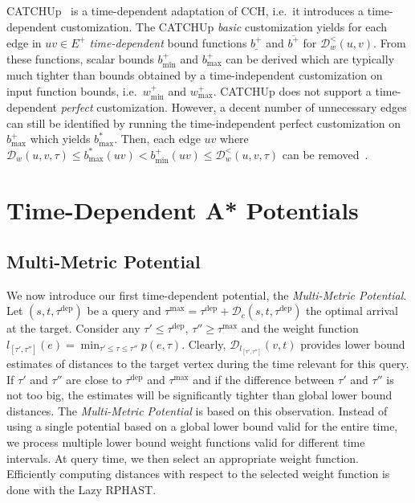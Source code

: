 \documentclass[a4paper,UKenglish,cleveref, autoref, thm-restate,anonymous]{lipics-v2021}
\newcommand*{\pred}{p}
\newcommand*{\dist}{\mathcal{D}}
\newcommand*{\tdep}{\tau^{\operatorname{dep}}}
\newcommand*{\tmax}{\tau^{\max}}
\begin{document}
CATCHUp~\cite{swz-sfert-21} is a time-dependent adaptation of CCH, i.e.\ it introduces a time-dependent customization.
The CATCHUp \emph{basic} customization yields for each edge in $uv \in E^+$ \emph{time-dependent} bound functions $\underline{b^+}$ and $\overline{b^+}$ for $\dist^<_w(u,v)$.
From these functions, scalar bounds $b^+_{\min}$ and $b^+_{\max}$ can be derived which are typically much tighter than bounds obtained by a time-independent customization on input function bounds, i.e.\ $w^+_{\min}$ and $w^+_{\max}$.
CATCHUp does not support a time-dependent \emph{perfect} customization.
However, a decent number of unnecessary edges can still be identified by running the time-independent perfect customization on $b^+_{\max}$ which yields $b^*_{\max}$.
Then, each edge $uv$ where $\dist_w(u,v,\tau) \leq b^*_{\max}(uv) < b^+_{\min}(uv) \leq \dist^<_w(u,v,\tau)$ can be removed~\cite{swz-sfert-21}.


\section{Time-Dependent A* Potentials}

\subsection{Multi-Metric Potential}

We now introduce our first time-dependent potential, the \emph{Multi-Metric Potential}.
Let $(s,t,\tdep)$ be a query and $\tmax = \tdep + \dist_c(s,t,\tdep)$ the optimal arrival at the target.
Consider any $\tau' \leq \tdep$, $\tau'' \geq \tmax$ and the weight function $l_{[\tau', \tau'']}(e) = \min_{\tau' \leq \tau \leq \tau''}\pred(e, \tau)$. %
Clearly, $\dist_{l_{[\tau', \tau'']}}(v,t)$ provides lower bound estimates of distances to the target vertex during the time relevant for this query.
If $\tau'$ and $\tau''$ are close to $\tdep$ and $\tmax$ and if the difference between $\tau'$ and $\tau''$ is not too big, the estimates will be significantly tighter than global lower bound distances.
The \emph{Multi-Metric Potential} is based on this observation.
Instead of using a single potential based on a global lower bound valid for the entire time, we process multiple lower bound weight functions valid for different time intervals.
At query time, we then select an appropriate weight function.
Efficiently computing distances with respect to the selected weight function is done with the Lazy RPHAST.
\end{document}
